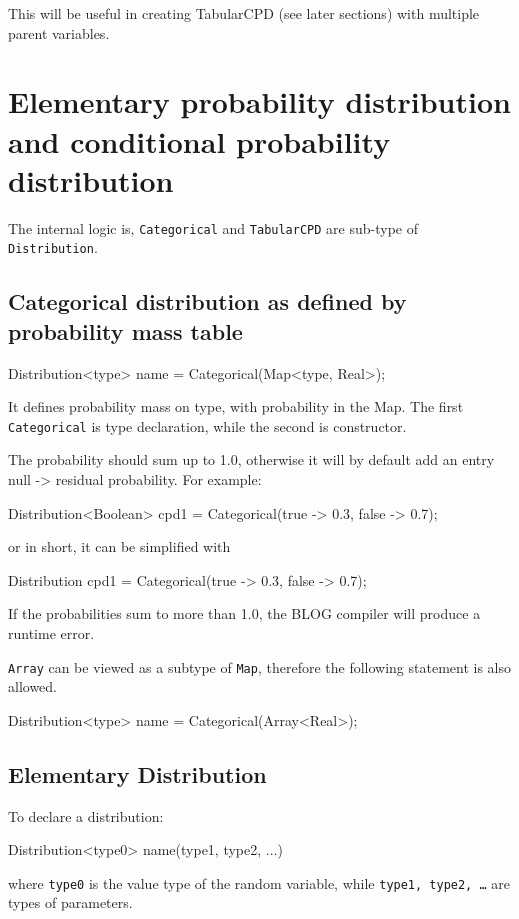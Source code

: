 \documentclass[12pt]{article}
\begin{document}
This will be useful in creating TabularCPD (see later sections) with multiple parent variables.



\section{Elementary probability distribution and conditional probability distribution}
\label{sec:distribution}
The internal logic is, \texttt{Categorical} and \texttt{TabularCPD} are sub-type of \texttt{Distribution}.

\subsection{Categorical distribution as defined by probability mass table}
\begin{blog}
Distribution<type>  name = Categorical(Map<type, Real>);
\end{blog}
It defines probability mass on type, with probability in the Map.
The first \texttt{Categorical} is type declaration, while the second is constructor. 

The probability should sum up to 1.0, otherwise it will by default add an entry null -> residual probability.
For example:
\begin{blog}
Distribution<Boolean> cpd1 = Categorical({true -> 0.3, false -> 0.7});
\end{blog}
or in short, it can be simplified with 
\begin{blog}
Distribution cpd1 = Categorical({true -> 0.3, false -> 0.7});
\end{blog}

If the probabilities sum to more than 1.0, the BLOG compiler will produce a runtime error.

\texttt{Array} can be viewed as a subtype of \texttt{Map}, therefore the following statement is also allowed.
\begin{blog}
Distribution<type>  name = Categorical(Array<Real>);
\end{blog}



\subsection{Elementary Distribution}
To declare a distribution:
\begin{blog}
Distribution<type0> name(type1, type2, ...)
\end{blog}
where {\tt type0}  is the value type of  the random variable, while {\tt type1, type2, \dots} are types of parameters.
\end{document}
